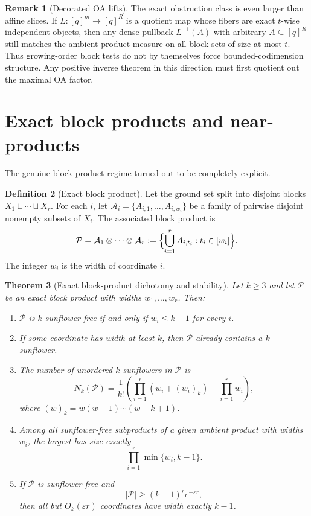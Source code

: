\documentclass[11pt]{article}
\newtheorem{theorem}{Theorem}[section]
\theoremstyle{definition}
\newtheorem{definition}[theorem]{Definition}
\newtheorem{remark}[theorem]{Remark}
\newcommand{\PP}{\mathcal{P}}
\newcommand{\eps}{\varepsilon}
\newcommand{\1}{\mathbf{1}}
\begin{document}
\begin{remark}[Decorated OA lifts]
The exact obstruction class is even larger than affine slices. If $L:[q]^m\to [q]^R$ is a quotient map whose fibers are exact $t$-wise independent objects, then any dense pullback $L^{-1}(A)$ with arbitrary $A\subseteq [q]^R$ still matches the ambient product measure on all block sets of size at most $t$. Thus growing-order block tests do not by themselves force bounded-codimension structure. Any positive inverse theorem in this direction must first quotient out the maximal OA factor.
\end{remark}

\section{Exact block products and near-products}\label{sec:block-products}
The genuine block-product regime turned out to be completely explicit.

\begin{definition}[Exact block product]
Let the ground set split into disjoint blocks $X_1\sqcup\cdots\sqcup X_r$. For each $i$, let $\mathcal A_i=\{A_{i,1},\dots,A_{i,w_i}\}$ be a family of pairwise disjoint nonempty subsets of $X_i$. The associated block product is
\[
\PP=\mathcal A_1\otimes\cdots\otimes \mathcal A_r:=\Bigl\{\bigcup_{i=1}^r A_{i,t_i}: t_i\in [w_i]\Bigr\}.
\]
The integer $w_i$ is the width of coordinate $i$.
\end{definition}

\begin{theorem}[Exact block-product dichotomy and stability]\label{thm:block-products}
Let $k\ge 3$ and let $\PP$ be an exact block product with widths $w_1,\dots,w_r$.
Then:
\begin{enumerate}[label=(\roman*),leftmargin=2.2em]
\item $\PP$ is $k$-sunflower-free if and only if $w_i\le k-1$ for every $i$.
\item If some coordinate has width at least $k$, then $\PP$ already contains a $k$-sunflower.
\item The number of unordered $k$-sunflowers in $\PP$ is
\[
N_k(\PP)=\frac{1}{k!}\left(\prod_{i=1}^r (w_i+(w_i)_k)-\prod_{i=1}^r w_i\right),
\]
where $(w)_k=w(w-1)\cdots(w-k+1)$.
\item Among all sunflower-free subproducts of a given ambient product with widths $w_i$, the largest has size exactly
\[
\prod_{i=1}^r \min\{w_i,k-1\}.
\]
\item If $\PP$ is sunflower-free and
\[
|\PP|\ge (k-1)^r e^{-\eps r},
\]
then all but $O_k(\eps r)$ coordinates have width exactly $k-1$.
\end{enumerate}
\end{theorem}
\end{document}
